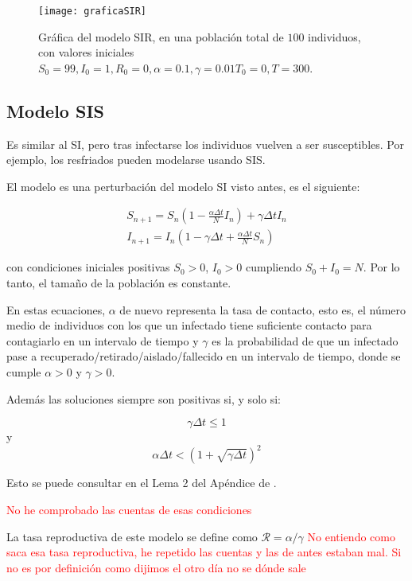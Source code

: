 \begin{figure}
\begin{center}
\caption{Gráfica del modelo SIR, en una población total de $100$ individuos, con valores iniciales $S_0=99, I_0 = 1, R_0 = 0, \alpha = 0.1, \gamma = 0.01 T_0 = 0, T = 300$.}
\texttt{[image: graficaSIR]}
\end{center}
\end{figure}


\subsection{Modelo SIS}
Es similar al SI, pero tras infectarse los individuos vuelven a ser susceptibles.
Por ejemplo, los resfriados pueden modelarse usando SIS.

El modelo es una perturbación del modelo SI visto antes, es el siguiente:

\begin{equation}
\label{eqn: modelo_SIS}
\begin{aligned}
S_{n+1} = S_n \left(1-\frac{\alpha\Delta t}{N} I_n \right) + \gamma \Delta t I_n \\
I_{n+1} = I_n \left( 1-\gamma \Delta t + \frac{\alpha\Delta t}{N} S_n \right)
\end{aligned}
\end{equation}

con condiciones iniciales positivas $S_0>0$, $I_0>0$ cumpliendo $S_0+I_0=N$. Por lo tanto, el tamaño de la población es constante.

En estas ecuaciones, $\alpha$ de nuevo representa la tasa de contacto, esto es, el número medio de individuos con los que un infectado tiene suficiente contacto para contagiarlo en un intervalo de tiempo y $\gamma$ es la probabilidad de que un infectado pase a recuperado/retirado/aislado/fallecido en un intervalo de tiempo, donde se cumple $\alpha >0$ y $\gamma >0$.

Además las soluciones siempre son positivas si, y solo si:

$$\gamma \Delta t \leq 1 $$ y $$\alpha\Delta t< \left( 1+\sqrt{\gamma \Delta t} \right)^2$$

Esto se puede consultar en el Lema 2 del Apéndice de \cite{allenDiscretetimeSISIR1994}.

\textcolor{red}{No he comprobado las cuentas de esas condiciones}

La tasa reproductiva de este modelo se define como $\mathcal{R}=\alpha /\gamma$ \textcolor{red}{No entiendo como saca esa tasa reproductiva, he repetido las cuentas y las de antes estaban mal. Si no es por definición como dijimos el otro día no se dónde sale}

